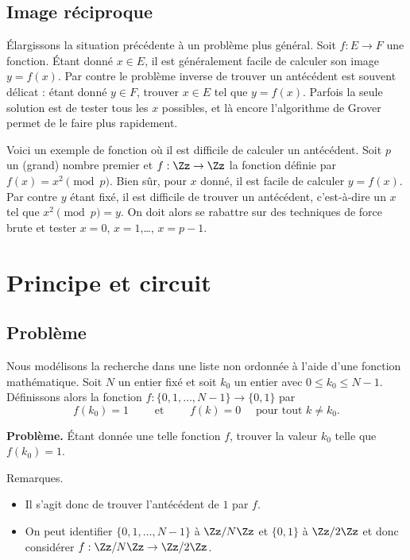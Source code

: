 \documentclass[11pt,class=report,crop=false]{standalone}
\begin{document}
\subsection{Image réciproque}

\'Elargissons la situation précédente à un problème plus général.
Soit $f : E \to F$ une fonction. \'Etant donné $x\in E$, il est généralement facile de calculer son image $y=f(x)$.
Par contre le problème inverse de trouver un antécédent est souvent délicat : étant donné $y\in F$, trouver $x\in E$ tel que $y=f(x)$.
Parfois la seule solution est de tester tous les $x$ possibles, et là encore l'algorithme de Grover permet de le faire plus rapidement.

Voici un exemple de fonction où il est difficile de calculer un antécédent. Soit $p$ un (grand) nombre premier et
$f : \Zz \to \Zz$ la fonction définie par $f(x) = x^2 \pmod{p}$. 
Bien sûr, pour $x$ donné, il est facile de calculer $y=f(x)$. Par contre $y$ étant fixé, il est difficile de trouver un antécédent, c'est-à-dire un $x$ tel que 
$x^2\pmod{p} = y$. On doit alors se rabattre sur des techniques de force brute et tester $x=0$, $x=1$,\ldots, $x=p-1$.


\section{Principe et circuit}

\subsection{Problème}

Nous modélisons la recherche dans une liste non ordonnée à l'aide d'une fonction mathématique.
Soit $N$ un entier fixé et soit $k_0$ un entier avec $0 \le k_0 \le N-1$.
Définissons alors la fonction $f : \{0,1,\ldots,N-1\} \to \{0,1\}$ par 
$$f(k_0) = 1 \qquad \text{ et } \qquad f(k) = 0 \quad \text{ pour tout $k\neq k_0$}.$$

\textbf{Problème.} \'Etant donnée une telle fonction $f$, trouver la valeur $k_0$ telle que $f(k_0)=1$.

Remarques.
\begin{itemize}
  \item Il s'agit donc de trouver l'antécédent de $1$ par $f$.

  \item On peut identifier $\{0,1,\ldots,N-1\}$ à $\Zz/N\Zz$ et $\{0,1\}$ à $\Zz/2\Zz$ et donc considérer $f : \Zz/N\Zz \to \Zz/2\Zz$.
\end{itemize}
\end{document}
